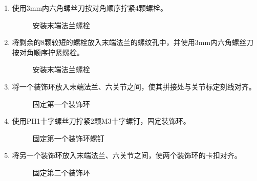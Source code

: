 \documentclass[a4paper,11pt,english,openany,oneside]{sphinxmanual}
\begin{document}
\begin{enumerate}
\item {} 
\sphinxAtStartPar
使用3mm内六角螺丝刀按对角顺序拧紧4颗螺栓。

\begin{figure}[H]
\centering
\capstart

\noindent{}
\caption{安装末端法兰螺栓}\label{\detokenize{_u66f4_u6362_u672b_u7aef_u6cd5_u5170:id17}}\end{figure}

\item {} 
\sphinxAtStartPar
将剩余的8颗较短的螺栓放入末端法兰的螺纹孔中，并使用3mm内六角螺丝刀按对角顺序拧紧螺栓。

\begin{figure}[H]
\centering
\capstart

\noindent{}
\caption{安装末端法兰螺栓}\label{\detokenize{_u66f4_u6362_u672b_u7aef_u6cd5_u5170:id18}}\end{figure}

\item {} 
\sphinxAtStartPar
将一个装饰环放入末端法兰、六关节之间，使其拼接处与关节标定刻线对齐。

\begin{figure}[H]
\centering
\capstart

\noindent{}
\caption{固定第一个装饰环}\label{\detokenize{_u66f4_u6362_u672b_u7aef_u6cd5_u5170:id19}}\end{figure}

\item {} 
\sphinxAtStartPar
使用PH1十字螺丝刀拧紧2颗M3十字螺钉，固定装饰环。

\begin{figure}[H]
\centering
\capstart

\noindent{}
\caption{固定第一个装饰环螺钉}\label{\detokenize{_u66f4_u6362_u672b_u7aef_u6cd5_u5170:id20}}\end{figure}

\item {} 
\sphinxAtStartPar
将另一个装饰环放入末端法兰、六关节之间，使两个装饰环的卡扣对齐。

\begin{figure}[H]
\centering
\capstart

\noindent{}
\caption{固定第二个装饰环}\label{\detokenize{_u66f4_u6362_u672b_u7aef_u6cd5_u5170:id21}}\end{figure}


\end{enumerate}
\end{document}
